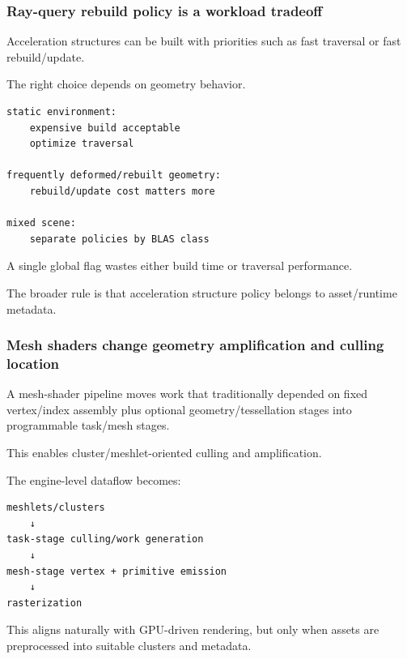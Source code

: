 \subsubsection{Ray-query rebuild policy is a workload tradeoff}\label{05-engine-i-ch023-ray-query-rebuild-policy-is-a-workload-tradeoff}

\hypertarget{05-engine-i-ch023-ray-query-rebuild-policy-is-a-workload-tradeoff}{}

Acceleration structures can be built with priorities such as fast traversal or fast rebuild/update.

The right choice depends on geometry behavior.

\begin{verbatim}
static environment:
    expensive build acceptable
    optimize traversal

frequently deformed/rebuilt geometry:
    rebuild/update cost matters more

mixed scene:
    separate policies by BLAS class
\end{verbatim}

A single global flag wastes either build time or traversal performance.

The broader rule is that acceleration structure policy belongs to asset/runtime metadata.

\subsubsection{Mesh shaders change geometry amplification and culling location}\label{05-engine-i-ch023-mesh-shaders-change-geometry-amplification-and-culling-location}

\hypertarget{05-engine-i-ch023-mesh-shaders-change-geometry-amplification-and-culling-location}{}

A mesh-shader pipeline moves work that traditionally depended on fixed vertex/index assembly plus optional geometry/tessellation stages into programmable task/mesh stages.

This enables cluster/meshlet-oriented culling and amplification.

The engine-level dataflow becomes:

\begin{verbatim}
meshlets/clusters
    ↓
task-stage culling/work generation
    ↓
mesh-stage vertex + primitive emission
    ↓
rasterization
\end{verbatim}

This aligns naturally with GPU-driven rendering, but only when assets are preprocessed into suitable clusters and metadata.

